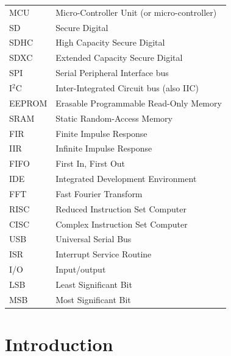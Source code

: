 \documentclass[english,12pt,a4paper,pdftex,elec,utf8]{aaltothesis}
\begin{document}
\begin{tabular}{ll}
MCU & Micro-Controller Unit (or micro-controller) \\
SD & Secure Digital \\
SDHC & High Capacity Secure Digital \\
SDXC & Extended Capacity Secure Digital \\
SPI & Serial Peripheral Interface bus \\
I$^2$C & Inter-Integrated Circuit bus (also IIC) \\
EEPROM & Erasable Programmable Read-Only Memory \\
SRAM & Static Random-Access Memory \\
FIR & Finite Impulse Response \\
IIR & Infinite Impulse Response \\
FIFO & First In, First Out \\
IDE & Integrated Development Environment \\
FFT & Fast Fourier Transform \\
RISC & Reduced Instruction Set Computer \\
CISC & Complex Instruction Set Computer \\
USB & Universal Serial Bus \\
ISR & Interrupt Service Routine \\
I/O & Input/output \\
LSB & Least Significant Bit \\
MSB & Most Significant Bit \\
\end{tabular}



\cleardoublepage
\storeinipagenumber
{}
\setcounter{page}{1}



\clearpage
\section{Introduction}
\thispagestyle{empty}
\end{document}
